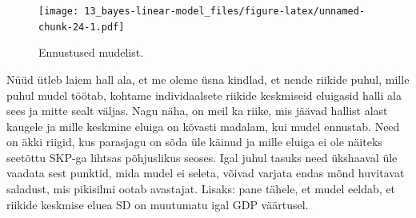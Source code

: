 \documentclass[]{book}
\newenvironment{Shaded}{\begin{snugshade}}{\end{snugshade}}
\newcommand{\KeywordTok}[1]{\textcolor[rgb]{0.13,0.29,0.53}{\textbf{#1}}}
\newcommand{\DataTypeTok}[1]{\textcolor[rgb]{0.13,0.29,0.53}{#1}}
\newcommand{\DecValTok}[1]{\textcolor[rgb]{0.00,0.00,0.81}{#1}}
\newcommand{\FloatTok}[1]{\textcolor[rgb]{0.00,0.00,0.81}{#1}}
\newcommand{\CharTok}[1]{\textcolor[rgb]{0.31,0.60,0.02}{#1}}
\newcommand{\StringTok}[1]{\textcolor[rgb]{0.31,0.60,0.02}{#1}}
\newcommand{\CommentTok}[1]{\textcolor[rgb]{0.56,0.35,0.01}{\textit{#1}}}
\newcommand{\OtherTok}[1]{\textcolor[rgb]{0.56,0.35,0.01}{#1}}
\newcommand{\OperatorTok}[1]{\textcolor[rgb]{0.81,0.36,0.00}{\textbf{#1}}}
\newcommand{\NormalTok}[1]{#1}
\begin{document}
\begin{Shaded}
\end{Shaded}

\begin{figure}
\centering
\texttt{[image: 13\_bayes-linear-model\_files/figure-latex/unnamed-chunk-24-1.pdf]}
\caption{\label{fig:unnamed-chunk-24}Ennustused mudelist.}
\end{figure}

Nüüd ütleb laiem hall ala, et me oleme üsna kindlad, et nende riikide
puhul, mille puhul mudel töötab, kohtame individaalsete riikide
keskmiseid eluigasid halli ala sees ja mitte sealt väljas. Nagu näha, on
meil ka riike, mis jäävad hallist alast kaugele ja mille keskmine eluiga
on kõvasti madalam, kui mudel ennustab. Need on äkki riigid, kus
parasjagu on sõda üle käinud ja mille eluiga ei ole näiteks seetõttu
SKP-ga lihtsas põhjuslikus seoses. Igal juhul tasuks need ükshaaval üle
vaadata sest punktid, mida mudel ei seleta, võivad varjata endas mõnd
huvitavat saladust, mis pikisilmi ootab avastajat. Lisaks: pane tähele,
et mudel eeldab, et riikide keskmise eluea SD on muutumatu igal GDP
väärtusel.
\end{document}
